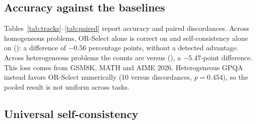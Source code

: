 \documentclass[preprint,11pt,number,sort&compress]{elsarticle}
\begin{document}
\subsection{Accuracy against the baselines}
\label{sec:accuracy-results}

Tables~\ref{tab:tracks}--\ref{tab:paired} report accuracy and paired
discordances. Across \HomogPooledN{} homogeneous problems, OR-Select
alone is correct on \HomogPooledB{} and self-consistency alone on
\HomogPooledC{} (\HomogPooledP): a difference of $-0.56$ percentage
points, without a detected advantage. Across \HeteroPooledN{} heterogeneous
problems the counts are \HeteroPooledB{} versus \HeteroPooledC{}
(\HeteroPooledP), a $-5.47$-point difference. This loss comes from GSM8K,
MATH and AIME 2026. Heterogeneous GPQA instead favors OR-Select numerically
(10 versus \SCwinsGPQAx{} discordances, $p=0.454$), so the pooled result
is not uniform across tasks.

\begin{table}[htbp]
\centering
\caption{Accuracy (\%) on graded problems, by track and selector. `--': no
Kemeny--Young comparator (GSM8K). Bold: best of the three practical
selectors when they differ. Primed rows: heterogeneous generation.}
\label{tab:tracks}
\small\setlength{\tabcolsep}{4pt}
\end{table}

\begin{table}[htbp]
\centering
\caption{Paired comparison of OR-Select with each reference selector. Cells
give (problems where OR-Select is right and the reference wrong)/(the
reverse) and the exact two-sided McNemar $p$-value.}
\label{tab:paired}
\small\setlength{\tabcolsep}{3pt}
\end{table}

\subsection{Universal self-consistency}
\label{sec:usc}
\end{document}
